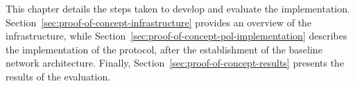 This chapter details the steps taken to develop and evaluate the \poc{} implementation. Section~\ref{sec:proof-of-concept-infrastructure} provides an overview of the infrastructure, while Section~\ref{sec:proof-of-concept-pol-implementation} describes the implementation of the \pol{} protocol, after the establishment of the baseline network architecture. Finally, Section~\ref{sec:proof-of-concept-results} presents the results of the \poc{} evaluation.

